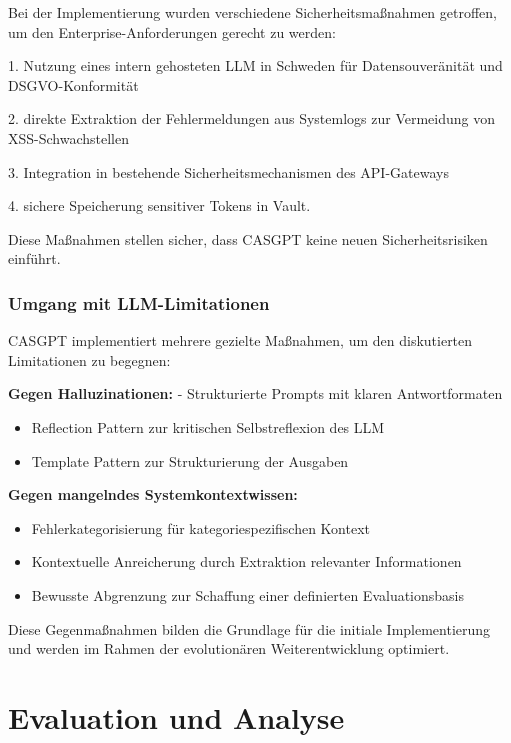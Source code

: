 \documentclass[
  a4paper,
  12pt,
  oneside,
  open=any,
  BCOR=12mm,
  DIV=14,
  parskip=half*,
  headsepline,
  footsepline,
  pointlessnumbers,
  liststotoc,
  numbers=noenddot,
  listof=totoc]{scrartcl}
\begin{document}
Bei der Implementierung wurden verschiedene Sicherheitsmaßnahmen
getroffen, um den Enterprise-Anforderungen gerecht zu werden:

1. Nutzung eines intern gehosteten LLM in Schweden für Datensouveränität
und DSGVO-Konformität

2. direkte Extraktion der Fehlermeldungen aus Systemlogs zur Vermeidung
von XSS-Schwachstellen

3. Integration in bestehende Sicherheitsmechanismen des API-Gateways

4. sichere Speicherung sensitiver Tokens in Vault.

Diese Maßnahmen stellen sicher, dass CASGPT keine neuen
Sicherheitsrisiken einführt.

\subsubsection{Umgang mit
LLM-Limitationen}\label{umgang-mit-llm-limitationen}

CASGPT implementiert mehrere gezielte Maßnahmen, um den diskutierten
Limitationen zu begegnen:

\textbf{Gegen Halluzinationen:} - Strukturierte Prompts mit klaren
Antwortformaten

\begin{itemize}
\item
  Reflection Pattern zur kritischen Selbstreflexion des LLM
\item
  Template Pattern zur Strukturierung der Ausgaben
\end{itemize}

\textbf{Gegen mangelndes Systemkontextwissen:}

\begin{itemize}
\item
  Fehlerkategorisierung für kategoriespezifischen Kontext
\item
  Kontextuelle Anreicherung durch Extraktion relevanter Informationen
\item
  Bewusste Abgrenzung zur Schaffung einer definierten Evaluationsbasis
\end{itemize}

Diese Gegenmaßnahmen bilden die Grundlage für die initiale
Implementierung und werden im Rahmen der evolutionären Weiterentwicklung
optimiert.

\section{Evaluation und Analyse}\label{evaluation-und-analyse}
\end{document}
